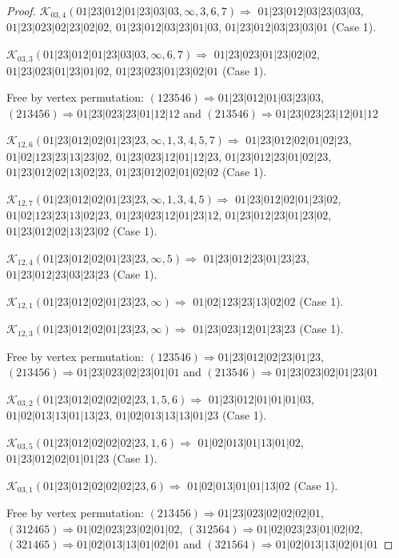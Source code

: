 \documentclass[12pt]{article}
\theoremstyle{plain}
\theoremstyle{definition}
\theoremstyle{remark}
\newcommand{\fancy}[1]{\mathcal{#1}}
\def\K{\fancy{K}}
\begin{document}
\begin{proof}
	$\K_{03,4}(01|23|012|01|23|03|03,\infty,3, 6, 7)\Rightarrow $ $01|23|012|03|23|03|03$, $01|23|023|02|23|02|02$, $01|23|012|03|23|01|03$, $01|23|012|03|23|03|01$ (Case 1).
	
	$\K_{03,3}(01|23|012|01|23|03|03,\infty,6, 7)\Rightarrow $ $01|23|023|01|23|02|02$, $01|23|023|01|23|01|02$, $01|23|023|01|23|02|01$ (Case 1).
	
	
	
	Free by vertex permutation: $(1 2 3 5 4 6)\Rightarrow 01|23|012|01|03|23|03$, $(2 1 3 4 5 6)\Rightarrow 01|23|023|23|01|12|12$ and $(2 1 3 5 4 6)\Rightarrow 01|23|023|23|12|01|12$
	
	
	
	\bigskip
	
	$\K_{12,6}(01|23|012|02|01|23|23,\infty,1, 3, 4, 5, 7)\Rightarrow $ $01|23|012|02|01|02|23$, $01|02|123|23|13|23|02$, $01|23|023|12|01|12|23$, $01|23|012|23|01|02|23$, $01|23|012|02|13|02|23$, $01|23|012|02|01|02|02$ (Case 1).
	
	$\K_{12,7}(01|23|012|02|01|23|23,\infty,1, 3, 4, 5)\Rightarrow $ $01|23|012|02|01|23|02$, $01|02|123|23|13|02|23$, $01|23|023|12|01|23|12$, $01|23|012|23|01|23|02$, $01|23|012|02|13|23|02$ (Case 1).
	
	$\K_{12,4}(01|23|012|02|01|23|23,\infty,5)\Rightarrow $ $01|23|012|23|01|23|23$, $01|23|012|23|03|23|23$ (Case 1).
	
	$\K_{12,1}(01|23|012|02|01|23|23,\infty)\Rightarrow $ $01|02|123|23|13|02|02$ (Case 1).
	
	$\K_{12,3}(01|23|012|02|01|23|23,\infty)\Rightarrow $ $01|23|023|12|01|23|23$ (Case 1).
	
	
	
	Free by vertex permutation: $(1 2 3 5 4 6)\Rightarrow 01|23|012|02|23|01|23$, $(2 1 3 4 5 6)\Rightarrow 01|23|023|02|23|01|01$ and $(2 1 3 5 4 6)\Rightarrow 01|23|023|02|01|23|01$
	
	
	
	\bigskip
	
	$\K_{03,2}(01|23|012|02|02|02|23,1, 5, 6)\Rightarrow $ $01|23|012|01|01|01|03$, $01|02|013|13|01|13|23$, $01|02|013|13|13|01|23$ (Case 1).
	
	$\K_{03,5}(01|23|012|02|02|02|23,1, 6)\Rightarrow $ $01|02|013|01|13|01|02$, $01|23|012|02|01|01|23$ (Case 1).
	
	$\K_{03,1}(01|23|012|02|02|02|23,6)\Rightarrow $ $01|02|013|01|01|13|02$ (Case 1).
	
	
	
	Free by vertex permutation: $(2 1 3 4 5 6)\Rightarrow 01|23|023|02|02|02|01$, $(3 1 2 4 6 5)\Rightarrow 01|02|023|23|02|01|02$, $(3 1 2 5 6 4)\Rightarrow 01|02|023|23|01|02|02$, $(3 2 1 4 6 5)\Rightarrow 01|02|013|13|01|02|01$ and $(3 2 1 5 6 4)\Rightarrow 01|02|013|13|02|01|01$
	

\end{proof}
\end{document}
